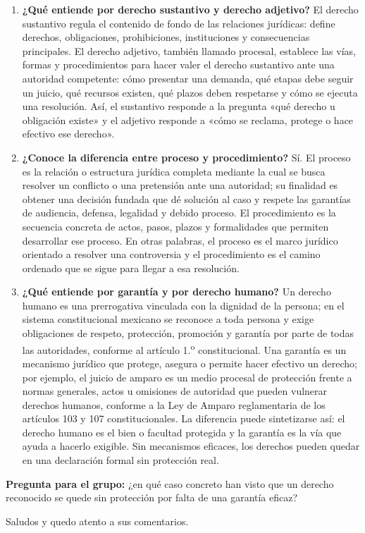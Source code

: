 \documentclass[
  spanish,
  letterpaper, oneside
]{article}
\begin{document}
\begin{forobox}[title={Participación publicada en el foro}]
\begin{enumerate}[leftmargin=1.6em,labelsep=0.6em,itemsep=0.5em,label=\textbf{\arabic*)}]
  \item \textbf{¿Qué entiende por derecho sustantivo y derecho adjetivo?} El derecho sustantivo regula el contenido de fondo de las relaciones jurídicas: define derechos, obligaciones, prohibiciones, instituciones y consecuencias principales. El derecho adjetivo, también llamado procesal, establece las vías, formas y procedimientos para hacer valer el derecho sustantivo ante una autoridad competente: cómo presentar una demanda, qué etapas debe seguir un juicio, qué recursos existen, qué plazos deben respetarse y cómo se ejecuta una resolución. Así, el sustantivo responde a la pregunta «qué derecho u obligación existe» y el adjetivo responde a «cómo se reclama, protege o hace efectivo ese derecho».

  \item \textbf{¿Conoce la diferencia entre proceso y procedimiento?} Sí. El proceso es la relación o estructura jurídica completa mediante la cual se busca resolver un conflicto o una pretensión ante una autoridad; su finalidad es obtener una decisión fundada que dé solución al caso y respete las garantías de audiencia, defensa, legalidad y debido proceso. El procedimiento es la secuencia concreta de actos, pasos, plazos y formalidades que permiten desarrollar ese proceso. En otras palabras, el proceso es el marco jurídico orientado a resolver una controversia y el procedimiento es el camino ordenado que se sigue para llegar a esa resolución.

  \item \textbf{¿Qué entiende por garantía y por derecho humano?} Un derecho humano es una prerrogativa vinculada con la dignidad de la persona; en el sistema constitucional mexicano se reconoce a toda persona y exige obligaciones de respeto, protección, promoción y garantía por parte de todas las autoridades, conforme al artículo 1.\textsuperscript{o} constitucional. Una garantía es un mecanismo jurídico que protege, asegura o permite hacer efectivo un derecho; por ejemplo, el juicio de amparo es un medio procesal de protección frente a normas generales, actos u omisiones de autoridad que pueden vulnerar derechos humanos, conforme a la Ley de Amparo reglamentaria de los artículos 103 y 107 constitucionales. La diferencia puede sintetizarse así: el derecho humano es el bien o facultad protegida y la garantía es la vía que ayuda a hacerlo exigible. Sin mecanismos eficaces, los derechos pueden quedar en una declaración formal sin protección real.
\end{enumerate}
\medskip

\textbf{Pregunta para el grupo:} ¿en qué caso concreto han visto que un derecho reconocido se quede sin protección por falta de una garantía eficaz?\par
\medskip
Saludos y quedo atento a sus comentarios.
\end{forobox}
\end{document}
